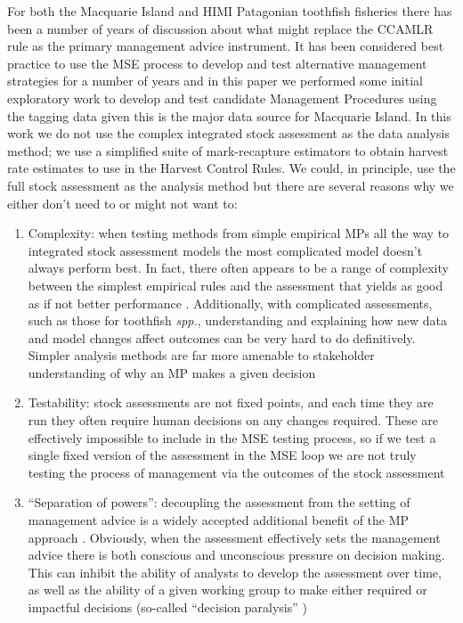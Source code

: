 \documentclass[12pt,a4paper,twoside,times,sky,standard]{csiroreport2017}
\begin{document}
For both the Macquarie Island and HIMI Patagonian toothfish fisheries there  has been a number of years of discussion about what might replace the CCAMLR rule as the primary management advice instrument. It has been considered best practice to use the MSE process to develop and test alternative management strategies for a number of years \cite{mse} and in this paper we performed some initial exploratory work to develop and test candidate Management Procedures using the tagging data given this is the major data source for Macquarie Island. In this work we do not use the complex integrated stock assessment as the data analysis method; we use a simplified suite of mark-recapture estimators to obtain harvest rate estimates to use in the Harvest Control Rules. We could, in principle, use the full stock assessment as the analysis method but there are several reasons why we either don't need to or might not want to:

\begin{enumerate}
    \item Complexity: when testing methods from simple empirical MPs all the way to integrated stock assessment models the most complicated model doesn't always perform best. In fact, there often appears to be a range of complexity between the simplest empirical rules and the assessment that yields as good as if not better performance \cite{mse,iwc,sbtmp,mprev}. Additionally, with complicated assessments, such as those for toothfish \textit{spp.}, understanding and explaining how new data and model changes affect outcomes can be very hard to do definitively. Simpler analysis methods are far more amenable to stakeholder understanding of why an MP makes a given decision
    \item Testability: stock assessments are not fixed points, and each time they are run they often require human decisions on any changes required. These are effectively impossible to include in the MSE testing process, so if we test a single fixed version of the assessment in the MSE loop we are not truly testing the process of management via the outcomes of the stock assessment
    \item ``Separation of powers'': decoupling the assessment from the setting of management advice is a widely accepted additional benefit of the MP approach \cite{iwc,sbtmp}. Obviously, when the assessment effectively sets the management advice there is both conscious and unconscious pressure on decision making. This can inhibit the ability of analysts to develop the assessment over time, as well as the ability of a given working group to make either required or impactful decisions (so-called ``decision paralysis'' \cite{sbtmp})
\end{enumerate}
\end{document}
